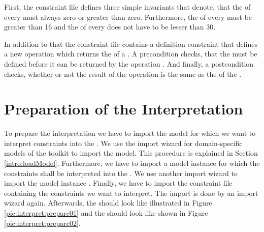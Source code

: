 First, the constraint file defines three simple invariants that denote, that the  of every  must always zero or greater than zero. Furthermore, the  of every  must be greater than 16 and the   of every  does not have to be lesser than 30.

In addition to that the constraint file contains a definition constraint that defines a new operation  which returns the  of a . A precondition checks, that the  must be defined before it can be returned by the operation . And finally, a postcondition checks, whether or not the result of the operation  is the same as the  of the .



\section{Preparation of the Interpretation}

To prepare the interpretation we have to import the model  for which we want to interpret constraints into the . We use the import wizard for domain-specific models of the toolkit to import the model. This procedure is explained in Section \ref{intro:loadModel}. Furthermore, we have to import a model instance for which the constraints shall be interpreted into the . We use another import wizard to import the model instance . Finally, we have to import the constraint file  containing the constraints we want to interpret. The import is done by an import wizard again. Afterwards, the  should look like illustrated in Figure \ref{pic:interpret:prepare01} and the  should look like shown in Figure \ref{pic:interpret:prepare02}.

